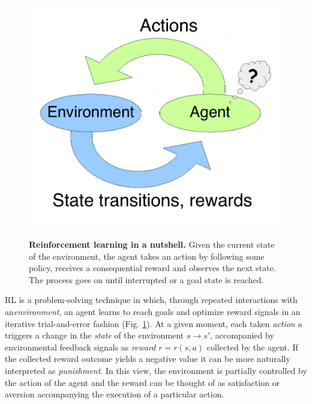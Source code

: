 \documentclass[10pt,letterpaper]{article}
\begin{document}
\begin{figure}
  \caption{\textbf{Reinforcement learning in a nutshell.} Given the current state of the environment,
    the agent takes an action by following some policy, receives a consequential reward and observes the next state. The process goes on until interrupted or a goal state is reached.}
  \centering
  \includegraphics[width=1.\linewidth]{rl.pdf}
  \label{fig:rl}
\end{figure}


RL is a problem-solving technique in which,
through repeated interactions with an\textit{environment},
an agent learns to reach goals and optimize reward signals
in an iterative trial-and-error fashion (Fig. \ref{fig:rl}).
At a given moment, each taken \textit{action} $a$ triggers a change
in the \textit{state} of the environment
$s \rightarrow s'$, accompanied by environmental feedback signals as \textit{reward}
$r = r(s, a)$ collected by the agent.
If the collected reward outcome yields a negative value it can be
more naturally interpreted as \textit{punishment}.
In this view, the environment is partially controlled by
the action of the agent and the reward can be thought
of as satisfaction \textemdash or aversion \textemdash accompanying the execution of
a particular action.
\end{document}
